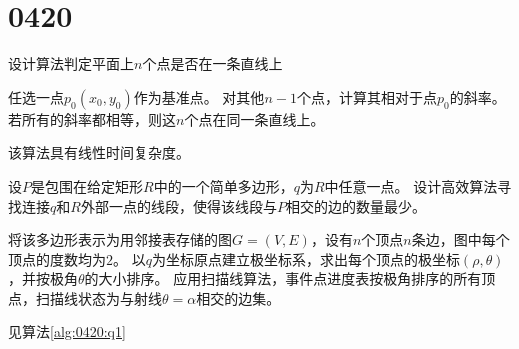 \section{0420}\label{sec:0420}
\begin{questions}

    \question 设计算法判定平面上$n$个点是否在一条直线上

    \begin{solution}
        任选一点$p_0(x_0,y_0)$作为基准点。
        对其他$n-1$个点，计算其相对于点$p_0$的斜率。
        若所有的斜率都相等，则这$n$个点在同一条直线上。

        该算法具有线性时间复杂度。
    \end{solution}

    \question 设$P$是包围在给定矩形$R$中的一个简单多边形，$q$为$R$中任意一点。
    设计高效算法寻找连接$q$和$R$外部一点的线段，使得该线段与$P$相交的边的数量最少。

    \begin{solution}
        将该多边形表示为用邻接表存储的图$G=(V,E)$，设有$n$个顶点$n$条边，图中每个顶点的度数均为$2$。
        以$q$为坐标原点建立极坐标系，求出每个顶点的极坐标$(\rho, \theta)$，并按极角$\theta$的大小排序。
        应用扫描线算法，事件点进度表按极角排序的所有顶点，扫描线状态为与射线$\theta = \alpha$相交的边集。

        见算法\ref{alg:0420:q1}
    \end{solution}


\end{questions}
